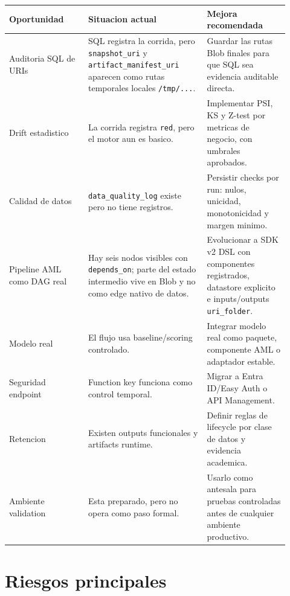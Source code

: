 \documentclass[11pt,letterpaper]{article}
\newcommand{\code}[1]{\texttt{\small #1}}
\begin{document}
\begin{longtable}{p{0.26\linewidth}p{0.39\linewidth}p{0.27\linewidth}}
\toprule
\textbf{Oportunidad} & \textbf{Situacion actual} & \textbf{Mejora recomendada}\\
\midrule
\endhead
Auditoria SQL de URIs & SQL registra la corrida, pero \code{snapshot\_uri} y \code{artifact\_manifest\_uri} aparecen como rutas temporales locales \code{/tmp/...}. & Guardar las rutas Blob finales para que SQL sea evidencia auditable directa.\\
Drift estadistico & La corrida registra \code{red}, pero el motor aun es basico. & Implementar PSI, KS y Z-test por metricas de negocio, con umbrales aprobados.\\
Calidad de datos & \code{data\_quality\_log} existe pero no tiene registros. & Persistir checks por run: nulos, unicidad, monotonicidad y margen minimo.\\
Pipeline AML como DAG real & Hay seis nodos visibles con \code{depends\_on}; parte del estado intermedio vive en Blob y no como edge nativo de datos. & Evolucionar a SDK v2 DSL con componentes registrados, datastore explicito e inputs/outputs \code{uri\_folder}.\\
Modelo real & El flujo usa baseline/scoring controlado. & Integrar modelo real como paquete, componente AML o adaptador estable.\\
Seguridad endpoint & Function key funciona como control temporal. & Migrar a Entra ID/Easy Auth o API Management.\\
Retencion & Existen outputs funcionales y artifacts runtime. & Definir reglas de lifecycle por clase de datos y evidencia academica.\\
Ambiente validation & Esta preparado, pero no opera como paso formal. & Usarlo como antesala para pruebas controladas antes de cualquier ambiente productivo.\\
\bottomrule
\end{longtable}

\section*{Riesgos principales}
\end{document}
